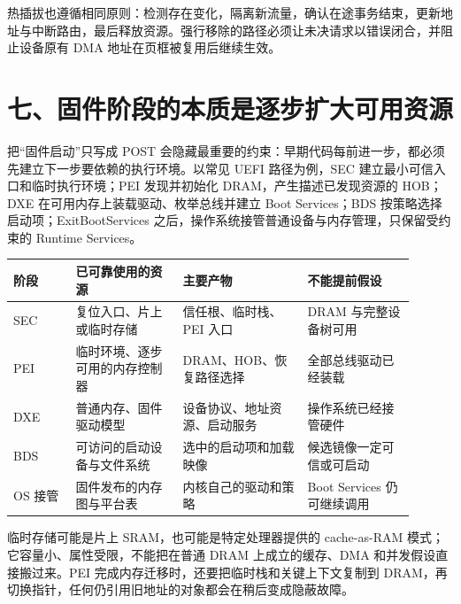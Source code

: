 热插拔也遵循相同原则：检测存在变化，隔离新流量，确认在途事务结束，更新地址与中断路由，最后释放资源。强行移除的路径必须让未决请求以错误闭合，并阻止设备原有 DMA 地址在页框被复用后继续生效。




























\section{七、固件阶段的本质是逐步扩大可用资源}

把“固件启动”只写成 POST 会隐藏最重要的约束：早期代码每前进一步，都必须先建立下一步要依赖的执行环境。以常见 UEFI 路径为例，SEC 建立最小可信入口和临时执行环境；PEI 发现并初始化 DRAM，产生描述已发现资源的 HOB；DXE 在可用内存上装载驱动、枚举总线并建立 Boot Services；BDS 按策略选择启动项；ExitBootServices 之后，操作系统接管普通设备与内存管理，只保留受约束的 Runtime Services。

\begin{longtable}{L{0.14\linewidth}L{0.24\linewidth}L{0.28\linewidth}L{0.24\linewidth}}
\toprule
阶段 & 已可靠使用的资源 & 主要产物 & 不能提前假设 \\
\midrule
SEC & 复位入口、片上或临时存储 & 信任根、临时栈、PEI 入口 & DRAM 与完整设备树可用 \\\tablerowrule
PEI & 临时环境、逐步可用的内存控制器 & DRAM、HOB、恢复路径选择 & 全部总线驱动已经装载 \\\tablerowrule
DXE & 普通内存、固件驱动模型 & 设备协议、地址资源、启动服务 & 操作系统已经接管硬件 \\\tablerowrule
BDS & 可访问的启动设备与文件系统 & 选中的启动项和加载映像 & 候选镜像一定可信或可启动 \\\tablerowrule
OS 接管 & 固件发布的内存图与平台表 & 内核自己的驱动和策略 & Boot Services 仍可继续调用 \\
\bottomrule
\end{longtable}

临时存储可能是片上 SRAM，也可能是特定处理器提供的 cache-as-RAM 模式；它容量小、属性受限，不能把在普通 DRAM 上成立的缓存、DMA 和并发假设直接搬过来。PEI 完成内存迁移时，还要把临时栈和关键上下文复制到 DRAM，再切换指针，任何仍引用旧地址的对象都会在稍后变成隐蔽故障。

